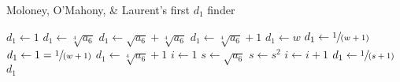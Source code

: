\begin{Algorithm}
\caption{Moloney, O'Mahony, \& Laurent's first $d_1$ finder}
\label{alg:d1}
\begin{algorithmic}
            \State $d_1 \gets 1$
        \Else
                \State $d_1 \gets \sqrt[4]{a_6}$
            \Else
                        \State $d_1 \gets \sqrt{a_6} + \sqrt[4]{a_6}$
                    \Else
                        \State $d_1 \gets \sqrt[4]{a_6} + 1$
                    \EndIf
                \Else
                            \State $d_1 \gets w$
                        \Else
                                \State $d_1 \gets \sfrac{1}{(w + 1)}$
                            \Else
                                \State $d_1 \gets 1 = \sfrac{1}{(w + 1)}$
                            \EndIf
                        \EndIf
                    \Else
                                \State $d_1 \gets \sqrt[4]{a_6} + 1$
                            \Else
                                \State $i \gets 1$
                                \State $s \gets \sqrt{a_6}$
                                    \State $s \gets s^2$
                                    \State $i \gets i + 1$
                                \EndWhile
                                \State $d_1 \gets \sfrac{1}{(s + 1)}$
                            \EndIf
                        \EndIf
                    \EndIf
                \EndIf
            \EndIf
        \EndIf
        \State \Return $d_1$
    \EndFunction
\end{algorithmic}
\end{Algorithm}

